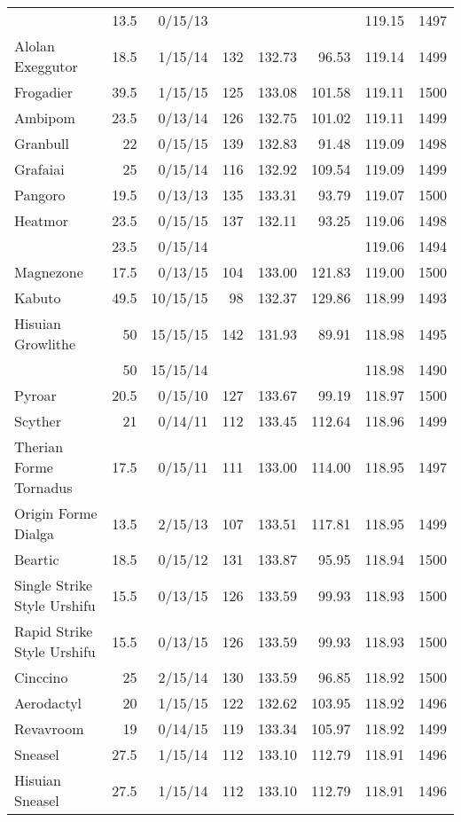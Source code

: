\begin{longtable}{lrrrrrrr}
 & 13.5 & 0/15/13 & & & & 119.15 & 1497\\
Alolan Exeggutor & 18.5 & 1/15/14 & 132 & 132.73 & 96.53 & 119.14 & 1499\\
Frogadier & 39.5 & 1/15/15 & 125 & 133.08 & 101.58 & 119.11 & 1500\\
Ambipom & 23.5 & 0/13/14 & 126 & 132.75 & 101.02 & 119.11 & 1499\\
Granbull & 22 & 0/15/15 & 139 & 132.83 & 91.48 & 119.09 & 1498\\
Grafaiai & 25 & 0/15/14 & 116 & 132.92 & 109.54 & 119.09 & 1499\\
Pangoro & 19.5 & 0/13/13 & 135 & 133.31 & 93.79 & 119.07 & 1500\\
Heatmor & 23.5 & 0/15/15 & 137 & 132.11 & 93.25 & 119.06 & 1498\\
 & 23.5 & 0/15/14 & & & & 119.06 & 1494\\
Magnezone & 17.5 & 0/13/15 & 104 & 133.00 & 121.83 & 119.00 & 1500\\
Kabuto & 49.5 & 10/15/15 & 98 & 132.37 & 129.86 & 118.99 & 1493\\
Hisuian Growlithe & 50 & 15/15/15 & 142 & 131.93 & 89.91 & 118.98 & 1495\\
 & 50 & 15/15/14 & & & & 118.98 & 1490\\
Pyroar & 20.5 & 0/15/10 & 127 & 133.67 & 99.19 & 118.97 & 1500\\
Scyther & 21 & 0/14/11 & 112 & 133.45 & 112.64 & 118.96 & 1499\\
Therian Forme Tornadus & 17.5 & 0/15/11 & 111 & 133.00 & 114.00 & 118.95 & 1497\\
Origin Forme Dialga & 13.5 & 2/15/13 & 107 & 133.51 & 117.81 & 118.95 & 1499\\
Beartic & 18.5 & 0/15/12 & 131 & 133.87 & 95.95 & 118.94 & 1500\\
Single Strike Style Urshifu & 15.5 & 0/13/15 & 126 & 133.59 & 99.93 & 118.93 & 1500\\
Rapid Strike Style Urshifu & 15.5 & 0/13/15 & 126 & 133.59 & 99.93 & 118.93 & 1500\\
Cinccino & 25 & 2/15/14 & 130 & 133.59 & 96.85 & 118.92 & 1500\\
Aerodactyl & 20 & 1/15/15 & 122 & 132.62 & 103.95 & 118.92 & 1496\\
Revavroom & 19 & 0/14/15 & 119 & 133.34 & 105.97 & 118.92 & 1499\\
Sneasel & 27.5 & 1/15/14 & 112 & 133.10 & 112.79 & 118.91 & 1496\\
Hisuian Sneasel & 27.5 & 1/15/14 & 112 & 133.10 & 112.79 & 118.91 & 1496\\

\end{longtable}
